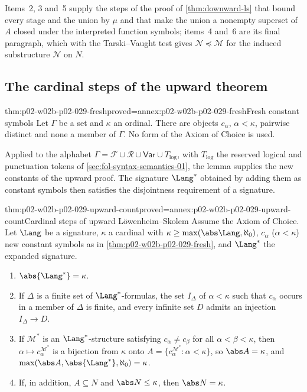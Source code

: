 Items~2, 3 and~5 supply the steps of the proof of \cref{thm:downward-ls}
that bound every stage and the union by \(\mu\) and that make the union a
nonempty superset of \(A\) closed under the interpreted function symbols;
items~4 and~6 are its final paragraph, which with the Tarski--Vaught test
gives \(\mathcal N\preccurlyeq\mathcal M\) for the induced substructure
\(\mathcal N\) on \(N\).

\subsection{The cardinal steps of the upward theorem}
\label{sec:p02-w02b-p02-029-upward}

\begin{hblemma}{thm:p02-w02b-p02-029-fresh}{proved=annex:p02-w02b-p02-029-fresh}{Fresh constant symbols}
Let \(\Gamma\) be a set and \(\kappa\) an ordinal. There are objects
\(c_\alpha\), \(\alpha<\kappa\), pairwise distinct and none a member of
\(\Gamma\). No form of the Axiom of Choice is used.
\end{hblemma}

Applied to the alphabet \(\Gamma=\mathcal F\cup\mathcal R\cup\mathsf{Var}\cup
T_{\mathrm{log}}\), with \(T_{\mathrm{log}}\) the reserved logical and
punctuation tokens of \cref{sec:fol-syntax-semantics-01}, the lemma supplies
the new constants of the upward proof. The signature \(\Lang^*\) obtained by
adding them as constant symbols then satisfies the disjointness requirement
of a signature.

\begin{hbtheorem}{thm:p02-w02b-p02-029-upward-count}{proved=annex:p02-w02b-p02-029-upward-count}{Cardinal steps of upward L\"owenheim--Skolem}
Assume the Axiom of Choice. Let \(\Lang\) be a signature, \(\kappa\) a
cardinal with \(\kappa\geq\max(\abs\Lang,\aleph_0)\), \(c_\alpha\)
(\(\alpha<\kappa\)) new constant symbols as in
\cref{thm:p02-w02b-p02-029-fresh}, and \(\Lang^*\) the expanded signature.
\begin{enumerate}
  \item \(\abs{\Lang^*}=\kappa\).
  \item If \(\Delta\) is a finite set of \(\Lang^*\)-formulas, the set
        \(I_\Delta\) of \(\alpha<\kappa\) such that \(c_\alpha\) occurs in a
        member of \(\Delta\) is finite, and every infinite set \(D\) admits
        an injection \(I_\Delta\to D\).
  \item If \(\mathcal M^*\) is an \(\Lang^*\)-structure satisfying
        \(c_\alpha\ne c_\beta\) for all \(\alpha<\beta<\kappa\), then
        \(\alpha\mapsto c_\alpha^{\mathcal M^*}\) is a bijection from
        \(\kappa\) onto \(A=\{c_\alpha^{\mathcal M^*}:\alpha<\kappa\}\), so
        \(\abs A=\kappa\), and
        \(\max(\abs A,\abs{\Lang^*},\aleph_0)=\kappa\).
  \item If, in addition, \(A\subseteq N\) and \(\abs N\leq\kappa\), then
        \(\abs N=\kappa\).
\end{enumerate}
\end{hbtheorem}

